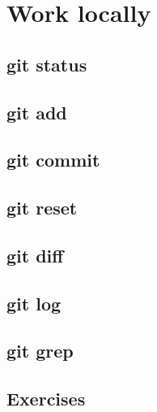 \section{Work locally}
\begin{frame}[fragile]
    \slidetitle
\end{frame}

\subsection{git status}
\begin{frame}[fragile]
    \subslidetitle
\end{frame}

\subsection{git add}
\begin{frame}[fragile]
    \subslidetitle
\end{frame}

\subsection{git commit}
\begin{frame}[fragile]
    \subslidetitle
\end{frame}

\subsection{git reset}
\begin{frame}[fragile]
    \subslidetitle
\end{frame}

\subsection{git diff}
\begin{frame}[fragile]
    \subslidetitle
\end{frame}

\subsection{git log}
\begin{frame}[fragile]
    \subslidetitle
\end{frame}

\subsection{git grep}
\begin{frame}[fragile]
    \subslidetitle
\end{frame}

\subsection{Exercises}
\begin{frame}[fragile]
  \subslidetitle
\end{frame}
